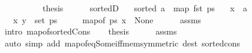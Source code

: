 \begin{isabellebody}
\ \ \ \ \isacommand{{\isachardot}{\kern0pt}{\isachardot}{\kern0pt}}\isamarkupfalse%
\isanewline
\ \ \isamarkupfalse%
\ \isamarkupfalse%
\ {\isacharquery}{\kern0pt}thesis\isanewline
\ \ \ \ \isacommand{{\isachardot}{\kern0pt}}\isamarkupfalse%
\isanewline
{}\isamarkupfalse%
%
\endisatagproof
{\isafoldproof}%
%
\isadelimproof
\isanewline
%
\endisadelimproof
%
\isadeliminvisible
\isanewline
%
\endisadeliminvisible
%
\isataginvisible
{}\isamarkupfalse%
\ sorted{}D{\isacharunderscore}{\kern0pt}{}{\isacharcolon}{\kern0pt}\isanewline
\ \ \ {\isachardoublequoteopen}sorted\ {\isacharparenleft}{\kern0pt}a\ {\isacharhash}{\kern0pt}\ map\ fst\ ps{\isacharparenright}{\kern0pt}{\isachardoublequoteclose}\isanewline
\ \ \ {\isachardoublequoteopen}x\ {\isacharless}{\kern0pt}\ a{\isachardoublequoteclose}\isanewline
\ \ \ {\isachardoublequoteopen}{\isacharparenleft}{\kern0pt}x{\isacharcomma}{\kern0pt}\ y{\isacharparenright}{\kern0pt}\ {\isasymnotin}\ set\ ps{\isachardoublequoteclose}%
\endisataginvisible
{\isafoldinvisible}%
%
\isadeliminvisible
\isanewline
%
\endisadeliminvisible
%
\isadelimproof
%
\endisadelimproof
%
\isatagproof
{}\isamarkupfalse%
\ {\isacharminus}{\kern0pt}\isanewline
\ \ \isamarkupfalse%
\ {\isachardoublequoteopen}map{\isacharunderscore}{\kern0pt}of\ ps\ x\ {\isacharequal}{\kern0pt}\ None{\isachardoublequoteclose}\isanewline
\ \ \ \ \isamarkupfalse%
\ assms\isanewline
\ \ \ \ \isamarkupfalse%
\ {\isacharparenleft}{\kern0pt}intro\ map{\isacharunderscore}{\kern0pt}of{\isacharunderscore}{\kern0pt}sorted{\isacharunderscore}{\kern0pt}Cons{\isacharparenright}{\kern0pt}\isanewline
\ \ \isamarkupfalse%
\ {\isacharquery}{\kern0pt}thesis\isanewline
\ \ \ \ \isamarkupfalse%
\ assms\isanewline
\ \ \ \ \isamarkupfalse%
\ {\isacharparenleft}{\kern0pt}auto\ simp\ add{\isacharcolon}{\kern0pt}\ map{\isacharunderscore}{\kern0pt}of{\isacharunderscore}{\kern0pt}eq{\isacharunderscore}{\kern0pt}Some{\isacharunderscore}{\kern0pt}iff{\isacharunderscore}{\kern0pt}mem{\isacharbrackleft}{\kern0pt}symmetric{\isacharbrackright}{\kern0pt}\ dest{\isacharcolon}{\kern0pt}\ sorted{\isacharunderscore}{\kern0pt}cons{\isacharparenright}{\kern0pt}\isanewline
{}\isamarkupfalse%
%
\endisatagproof
{\isafoldproof}%
%
\isadelimproof
\isanewline
%
\endisadelimproof
%
\isadeliminvisible
\isanewline
%
\endisadeliminvisible

\end{isabellebody}
